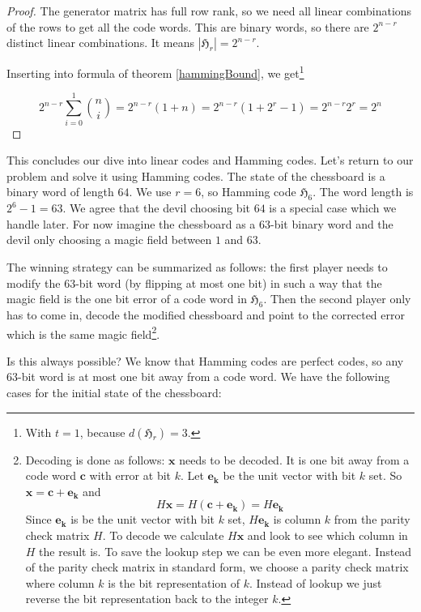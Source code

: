 \begin{proof}

The generator matrix has full row rank, so we need all linear combinations of the rows to get all the code words. This are binary words, so there are $2^{n - r}$ distinct linear combinations. It means $|\mathfrak{H}_r| = 2^{n - r}$.

Inserting into formula of theorem \ref{hammingBound}, we get\footnote{With $t = 1$, because $d(\mathfrak{H}_r) = 3$.}

$$
2^{n - r} \sum_{i = 0}^1 \binom{n}{i} = 2^{n - r} (1 + n) = 2^{n - r} (1 + 2^r - 1) = 2^{n - r} 2^r = 2^n
$$

\end{proof}

This concludes our dive into linear codes and Hamming codes. Let's return to our problem and solve it using Hamming codes. The state of the chessboard is a binary word of length $64$. We use $r = 6$, so Hamming code $\mathfrak{H}_6$. The word length is $2^6 - 1 = 63$. We agree that the devil choosing bit $64$ is a special case which we handle later. For now imagine the chessboard as a $63$-bit binary word and the devil only choosing a magic field between $1$ and $63$.

The winning strategy can be summarized as follows: the first player needs to modify the $63$-bit word (by flipping at most one bit) in such a way that the magic field is the one bit error of a code word in $\mathfrak{H}_6$. Then the second player only has to come in, decode the modified chessboard and point to the corrected error which is the same magic field\footnote{Decoding\label{decodingSideNote} is done as follows: $\bm{x}$ needs to be decoded. It is one bit away from a code word $\bm{c}$ with error at bit $k$. Let $\bm{e_k}$ be the unit vector with bit $k$ set. So $\bm{x} = \bm{c} + \bm{e_k}$ and 
$$
H \bm{x} = H (\bm{c} + \bm{e_k}) = H \bm{e_k}
$$
Since $\bm{e_k}$ is be the unit vector with bit $k$ set, $H \bm{e_k}$ is column $k$ from the parity check matrix $H$. To decode we calculate $H \bm{x}$ and look to see which column in $H$ the result is. To save the lookup step we can be even more elegant. Instead of the parity check matrix in standard form, we choose a parity check matrix where column $k$ is the bit representation of $k$. Instead of lookup we just reverse the bit representation back to the integer $k$.
}.

Is this always possible? We know that Hamming codes are perfect codes, so any $63$-bit word is at most one bit away from a code word. We have the following cases for the initial state of the chessboard:

